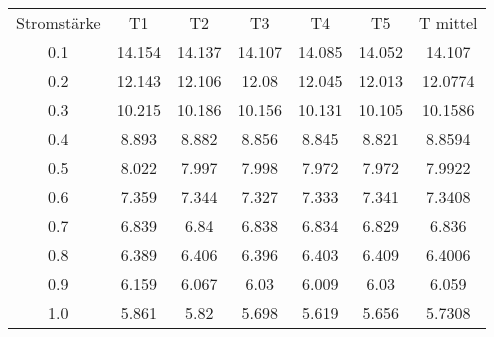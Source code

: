 \begin{table}
\begin{tabular}{ccccccc}
Stromstärke & T1 & T2 & T3 & T4 & T5 & T mittel \\
0.1 & 14.154 & 14.137 & 14.107 & 14.085 & 14.052 & 14.107 \\
0.2 & 12.143 & 12.106 & 12.08 & 12.045 & 12.013 & 12.0774 \\
0.3 & 10.215 & 10.186 & 10.156 & 10.131 & 10.105 & 10.1586 \\
0.4 & 8.893 & 8.882 & 8.856 & 8.845 & 8.821 & 8.8594 \\
0.5 & 8.022 & 7.997 & 7.998 & 7.972 & 7.972 & 7.9922 \\
0.6 & 7.359 & 7.344 & 7.327 & 7.333 & 7.341 & 7.3408 \\
0.7 & 6.839 & 6.84 & 6.838 & 6.834 & 6.829 & 6.836 \\
0.8 & 6.389 & 6.406 & 6.396 & 6.403 & 6.409 & 6.4006 \\
0.9 & 6.159 & 6.067 & 6.03 & 6.009 & 6.03 & 6.059 \\
1.0 & 5.861 & 5.82 & 5.698 & 5.619 & 5.656 & 5.7308 \\
\end{tabular}
\end{table}
